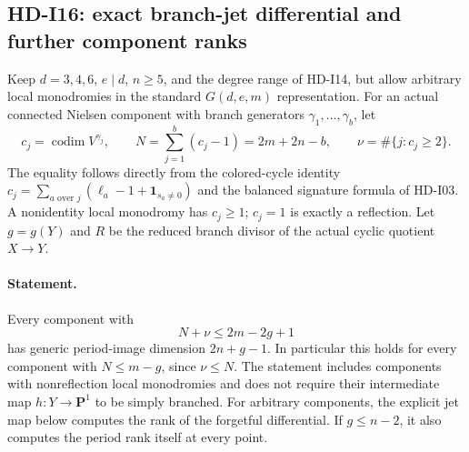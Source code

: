 \subsection{HD-I16: exact branch-jet differential and further component ranks}
\label{sec:HD-I16}

Keep $d=3,4,6$, $e\mid d$, $n\geq5$, and the degree range of
HD-I14, but allow arbitrary local monodromies in the standard
$G(d,e,m)$ representation.  For an actual connected Nielsen component
with branch generators $\gamma_1,\ldots,\gamma_b$, let
\[
 c_j=\operatorname{codim}V^{\gamma_j},\qquad
 N=\sum_{j=1}^b(c_j-1)=2m+2n-b,
 \qquad \nu=\#\{j:c_j\geq2\}.
 \tag{I16.1}
\]
The equality follows directly from the colored-cycle identity
$c_j=\sum_{a\text{ over }j}(\ell_a-1+\boldsymbol1_{s_a\ne0})$
and the balanced signature formula of HD-I03.  A nonidentity local
monodromy has $c_j\geq1$; $c_j=1$ is exactly a reflection.
Let $g=g(Y)$ and $R$ be the reduced branch divisor of the actual
cyclic quotient $X\to Y$.

\paragraph{Statement.}
Every component with
\begin{equation}
           N+\nu\leq2m-2g+1                         \tag{I16.2}
\end{equation}
has generic period-image dimension $2n+g-1$.
In particular this holds for every component with $N\leq m-g$,
since $\nu\leq N$.  The statement includes components with
nonreflection local monodromies and does not require their
intermediate map $h:Y\to\mathbf P^1$ to be simply branched.
For arbitrary components, the explicit jet map below computes
the rank of the forgetful differential.  If $g\leq n-2$, it also
computes the period rank itself at every point.

